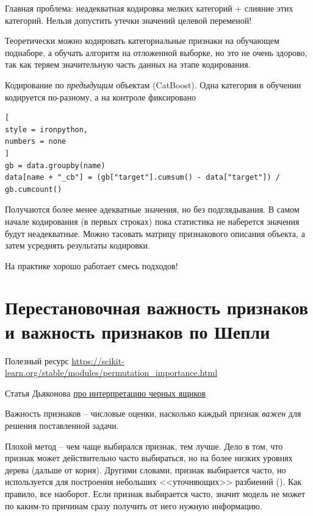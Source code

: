 \documentclass[%
	11pt,
	a4paper,
	utf8,
		]{article}
\begin{document}
Главная проблема: неадекватная кодировка мелких категорий + слияние этих категорий. Нельзя допустить утечки значений целевой переменой!

Теоретически можно кодировать категориальные признаки на обучающем поднаборе, а обучать алгоритм на отложенной выборке, но это не очень здорово, так как теряем значительную часть данных на этапе кодирования.

Кодирование по \emph{предыдущим} объектам (CatBoost). Одна категория в обучении кодируется по-разному, а на контроле фиксировано
\begin{lstlisting}[
style = ironpython,
numbers = none	
]
gb = data.groupby(name)
data[name + "_cb"] = (gb["target"].cumsum() - data["target"]) / gb.cumcount()
\end{lstlisting}

Получаются более менее адекватные значения, но без подглядывания. В самом начале кодирования (в первых строках) пока статистика не наберется значения будут неадекватные. Можно тасовать матрицу признакового описания объекта, а затем усреднять результаты кодировки.

На практике хорошо работает смесь подходов!


\section{Перестановочная важность признаков и важность признаков по Шепли}

Полезный ресурс \url{https://scikit-learn.org/stable/modules/permutation_importance.html}

Статья Дьяконова \href{https://dyakonov.org/2018/08/28/%d0%b8%d0%bd%d1%82%d0%b5%d1%80%d0%bf%d1%80%d0%b5%d1%82%d0%b0%d1%86%d0%b8%d0%b8-%d1%87%d1%91%d1%80%d0%bd%d1%8b%d1%85-%d1%8f%d1%89%d0%b8%d0%ba%d0%be%d0%b2/}{про интерпретацию черных ящиков}

Важность признаков -- числовые оценки, насколько каждый признак \emph{важен} для решения поставленной задачи.

{\color{red} Плохой метод -- чем чаще выбирался признак, тем лучше.} Дело в том, что признак может действительно часто выбираться, но на более низких уровнях дерева (дальше от корня). Другими словами, признак выбирается часто, но используется для построения небольших <<уточняющих>> разбиений (). Как правило, все наоборот. Если признак выбирается часто, значит модель не может по каким-то причинам сразу получить от него нужную информацию.
\end{document}
